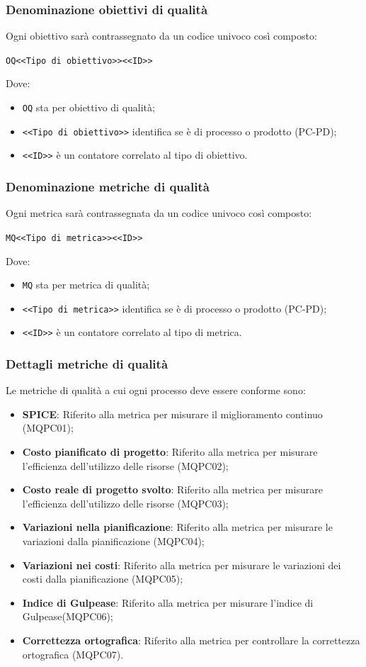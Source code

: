 \subsubsection{Denominazione obiettivi di qualità}
Ogni obiettivo sarà contrassegnato da un codice univoco così composto:
\begin{center}
	\verb|OQ<<Tipo di obiettivo>><<ID>>|
\end{center}
Dove:
\begin{itemize}
	\item \verb|OQ| sta per obiettivo di qualità;
	\item \verb|<<Tipo di obiettivo>>| identifica se è di processo o prodotto (PC-PD);
	\item \verb|<<ID>>| è un contatore correlato al tipo di obiettivo.
\end{itemize}
\subsubsection{Denominazione metriche di qualità}
Ogni metrica sarà contrassegnata da un codice univoco così composto:
\begin{center}
	\verb|MQ<<Tipo di metrica>><<ID>>|
\end{center}
Dove:
\begin{itemize}
	\item \verb|MQ| sta per metrica di qualità;
	\item \verb|<<Tipo di metrica>>| identifica se è di processo o prodotto (PC-PD);
	\item \verb|<<ID>>| è un contatore correlato al tipo di metrica.
\end{itemize}
\subsubsection{Dettagli metriche di qualità}
Le metriche di qualità a cui ogni processo deve essere conforme sono:
\begin{itemize}
	\item \textbf{SPICE}: Riferito alla metrica per misurare il miglioramento continuo (MQPC01);
	\item \textbf{Costo pianificato di progetto}: Riferito alla metrica per misurare l'efficienza dell'utilizzo delle risorse (MQPC02);
	\item \textbf{Costo reale di progetto svolto}: Riferito alla metrica per misurare l'efficienza dell'utilizzo delle risorse (MQPC03);
	\item \textbf{Variazioni nella pianificazione}: Riferito alla metrica per misurare le variazioni dalla pianificazione (MQPC04);
	\item \textbf{Variazioni nei costi}: Riferito alla metrica per misurare le variazioni dei costi dalla pianificazione (MQPC05);
	\item \textbf{Indice di Gulpease}: Riferito alla metrica per misurare l'indice di Gulpease(MQPC06);
	\item \textbf{Correttezza ortografica}: Riferito alla metrica per controllare la correttezza ortografica (MQPC07).
\end{itemize}
